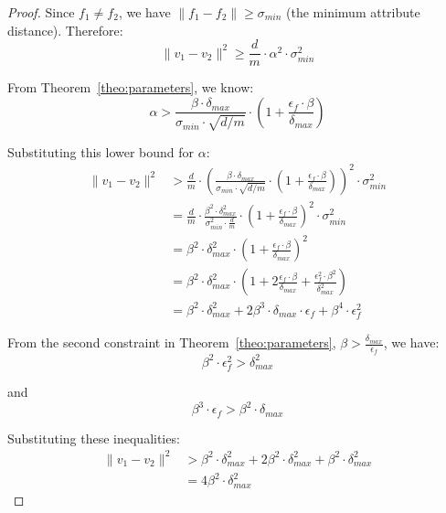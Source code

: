 \documentclass[numbers,sort]{article}
\begin{document}
\begin{proof}
Since $f_1 \neq f_2$, we have $\|f_1 - f_2\| \geq \sigma_{min}$ (the minimum attribute distance). Therefore:
\begin{equation}
\|v_1 - v_2\|^2 \geq \frac{d}{m} \cdot \alpha^2 \cdot \sigma_{min}^2
\end{equation}

From Theorem~\ref{theo:parameters}, we know:
\begin{equation}
\alpha > \frac{\beta \cdot \delta_{max}}{\sigma_{min} \cdot \sqrt{d/m}} \cdot \left(1 + \frac{\epsilon_f \cdot \beta}{\delta_{max}}\right)
\end{equation}

Substituting this lower bound for $\alpha$:
\begin{align}
\|v_1 - v_2\|^2 &> \frac{d}{m} \cdot \left(\frac{\beta \cdot \delta_{max}}{\sigma_{min} \cdot \sqrt{d/m}} \cdot \left(1 + \frac{\epsilon_f \cdot \beta}{\delta_{max}}\right)\right)^2 \cdot \sigma_{min}^2 \\
&= \frac{d}{m} \cdot \frac{\beta^2 \cdot \delta_{max}^2}{\sigma_{min}^2 \cdot \frac{d}{m}} \cdot \left(1 + \frac{\epsilon_f \cdot \beta}{\delta_{max}}\right)^2 \cdot \sigma_{min}^2 \\
&= \beta^2 \cdot \delta_{max}^2 \cdot \left(1 + \frac{\epsilon_f \cdot \beta}{\delta_{max}}\right)^2 \\
&= \beta^2 \cdot \delta_{max}^2 \cdot \left(1 + 2\frac{\epsilon_f \cdot \beta}{\delta_{max}} + \frac{\epsilon_f^2 \cdot \beta^2}{\delta_{max}^2}\right) \\
&= \beta^2 \cdot \delta_{max}^2 + 2\beta^3 \cdot \delta_{max} \cdot \epsilon_f + \beta^4 \cdot \epsilon_f^2
\end{align}

From the second constraint in Theorem~\ref{theo:parameters}, $\beta > \frac{\delta_{max}}{\epsilon_f}$, we have:
\begin{equation}
\beta^2 \cdot \epsilon_f^2 > \delta_{max}^2
\end{equation}

and 
\begin{equation}
\beta^3 \cdot \epsilon_f > \beta^2 \cdot \delta_{max}
\end{equation}

Substituting these inequalities:
\begin{align}
\|v_1 - v_2\|^2 &> \beta^2 \cdot \delta_{max}^2 + 2\beta^2 \cdot \delta_{max}^2 + \beta^2 \cdot \delta_{max}^2 \\
&= 4\beta^2 \cdot \delta_{max}^2
\end{align}


\end{proof}
\end{document}
